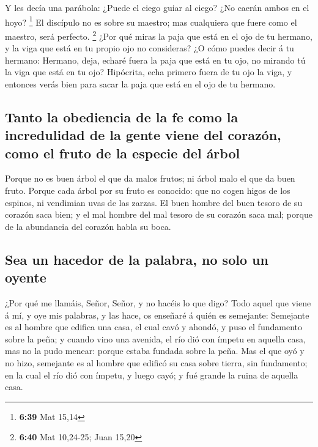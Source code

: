  Y les decía una parábola: ¿Puede el ciego guiar al
ciego? ¿No caerán ambos en el hoyo? \footnote{\textbf{6:39} Mat 15,14}
 El discípulo no es sobre su maestro; mas cualquiera que
fuere como el maestro, será perfecto. \footnote{\textbf{6:40} Mat
  10,24-25; Juan 15,20}  ¿Por qué miras la paja que está
en el ojo de tu hermano, y la viga que está en tu propio ojo no
consideras?  ¿O cómo puedes decir á tu hermano: Hermano,
deja, echaré fuera la paja que está en tu ojo, no mirando tú la viga que
está en tu ojo? Hipócrita, echa primero fuera de tu ojo la viga, y
entonces verás bien para sacar la paja que está en el ojo de tu hermano.

\hypertarget{tanto-la-obediencia-de-la-fe-como-la-incredulidad-de-la-gente-viene-del-corazuxf3n-como-el-fruto-de-la-especie-del-uxe1rbol}{%
\subsection{Tanto la obediencia de la fe como la incredulidad de la
gente viene del corazón, como el fruto de la especie del
árbol}\label{tanto-la-obediencia-de-la-fe-como-la-incredulidad-de-la-gente-viene-del-corazuxf3n-como-el-fruto-de-la-especie-del-uxe1rbol}}

 Porque no es buen árbol el que da malos frutos; ni árbol
malo el que da buen fruto.  Porque cada árbol por su
fruto es conocido: que no cogen higos de los espinos, ni vendimian uvas
de las zarzas.  El buen hombre del buen tesoro de su
corazón saca bien; y el mal hombre del mal tesoro de su corazón saca
mal; porque de la abundancia del corazón habla su boca.

\hypertarget{sea-un-hacedor-de-la-palabra-no-solo-un-oyente}{%
\subsection{Sea un hacedor de la palabra, no solo un
oyente}\label{sea-un-hacedor-de-la-palabra-no-solo-un-oyente}}

 ¿Por qué me llamáis, Señor, Señor, y no hacéis lo que
digo?  Todo aquel que viene á mí, y oye mis palabras, y
las hace, os enseñaré á quién es semejante:  Semejante es
al hombre que edifica una casa, el cual cavó y ahondó, y puso el
fundamento sobre la peña; y cuando vino una avenida, el río dió con
ímpetu en aquella casa, mas no la pudo menear: porque estaba fundada
sobre la peña.  Mas el que oyó y no hizo, semejante es al
hombre que edificó su casa sobre tierra, sin fundamento; en la cual el
río dió con ímpetu, y luego cayó; y fué grande la ruina de aquella casa.

